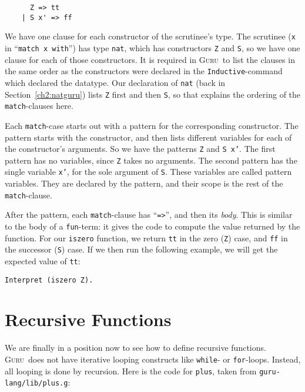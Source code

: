 \documentclass{book}[12pt]
\newcommand{\guru}[0]{\textsc{Guru}}
\begin{document}
\begin{verbatim}
      Z => tt 
    | S x' => ff
\end{verbatim}

\noindent We have one clause for each constructor of the scrutinee's
type.  The scrutinee (\texttt{x} in ``\texttt{match x with}'') has
type \texttt{nat}, which has constructors \texttt{Z} and \texttt{S},
so we have one clause for each of those constructors.  It is required
in \guru\ to list the clauses in the same order as the constructors
were declared in the \texttt{Inductive}-command which declared the
datatype.  Our declaration of \texttt{nat} (back in
Section~\ref{ch2:natguru}) lists \texttt{Z} first and then \texttt{S},
so that explains the ordering of the \texttt{match}-clauses here.

Each \texttt{match}-case starts out with a pattern for the
corresponding constructor.  The pattern starts with the constructor,
and then lists different variables for each of the constructor's
arguments.  So we have the patterns \texttt{Z} and \texttt{S x'}.  The
first pattern has no variables, since \texttt{Z} takes no arguments.
The second pattern has the single variable \texttt{x'}, for the sole
argument of \texttt{S}.  These variables are called pattern variables.
They are declared by the pattern, and their scope is the rest of the
\texttt{match}-clause.

After the pattern, each \texttt{match}-clause has ``\texttt{=>}'', and
then its \emph{body}.  This is similar to the body of a
\texttt{fun}-term: it gives the code to compute the value returned by
the function.  For our \texttt{iszero} function, we return \texttt{tt}
in the zero (\texttt{Z}) case, and \texttt{ff} in the successor
(\texttt{S}) case.  If we then run the following example, we will get
the expected value of \texttt{tt}:

\begin{verbatim}
Interpret (iszero Z).
\end{verbatim}

\section{Recursive Functions}

We are finally in a position now to see how to define recursive
functions.  \guru\ does not have iterative looping constructs like
\texttt{while}- or \texttt{for}-loops.  Instead, all looping is done
by recursion.  Here is the code for \texttt{plus}, taken from
\texttt{guru-lang/lib/plus.g}:
\end{document}
